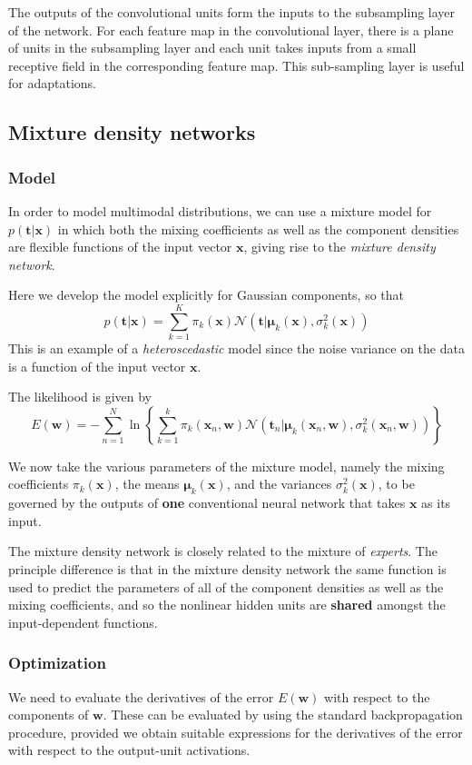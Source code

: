 \documentclass[a4paper]{report}
\renewcommand{\bf}{\mathbf}
\renewcommand{\cal}{\mathcal}
\newcommand{\imp}[1]{{\color{blue}\textit{#1}}}
\newcommand{\bs}{\boldsymbol}
\begin{document}
The outputs of the convolutional units form the inputs to the subsampling layer of the network. For each feature map in the convolutional layer, there is a plane of units in the subsampling layer and each unit takes inputs from a small receptive field in the corresponding feature map. This sub-sampling layer is useful for adaptations.
\subsection{Mixture density networks}
\subsubsection{Model}
In order to model multimodal distributions, we can use a mixture model for $p(\bf{t|x})$ in which both the mixing coefficients as well as the component densities are flexible functions of the input vector $\bf{x}$, giving rise to the \imp{mixture density network}.

Here we develop the model explicitly for Gaussian components, so that
\begin{equation}
	p(\bf{t|x}) = \sum_{k=1}^K \pi_k(\bf{x}) \cal{N}(\bf{t}|\bs{\mu}_k(\bf{x}),\sigma_k^2(\bf{x}))
\end{equation}
This is an example of a \imp{heteroscedastic} model since the noise variance on the data is a function of the input vector $\bf{x}$.

The likelihood is given by
\begin{equation}
	E(\bf{w})= - \sum_{n=1}^N \ln \left\{ \sum_{k=1}^k \pi_k(\bf{x}_n,\bf{w})\cal{N}(\bf{t}_n|\bs{\mu}_k(\bf{x}_n,\bf{w}),\sigma_k^2(\bf{x}_n,\bf{w})) \right\}
\end{equation}

We now take the various parameters of the mixture model, namely the mixing coefficients $\pi_k(\bf{x})$, the means $\bs{\mu}_k(\bf{x})$, and the variances $\sigma_k^2(\bf{x})$, to be governed by the outputs of \textbf{one} conventional neural network that takes $\bf{x}$ as its input. 

The mixture density network is closely related to the mixture of \imp{experts}. The principle difference is that in the mixture density network the same function is used to predict the parameters of all of the component densities as well as the mixing coefficients, and so the nonlinear hidden units are \textbf{shared} amongst the input-dependent functions.
\subsubsection{Optimization}
We need to evaluate the derivatives of the error $E(\bf{w})$ with respect to the components of $\bf{w}$. These can be evaluated by using the standard backpropagation procedure, provided we obtain suitable expressions for the derivatives of the error with respect to the output-unit activations.
\end{document}
